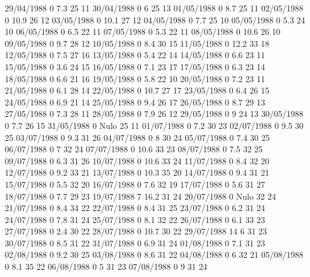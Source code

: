 29/04/1988  0      7.3    25     11 
30/04/1988  0      6      25     13 
01/05/1988  0      8.7    25     11 
02/05/1988  0      10.9   26     12 
03/05/1988  0      10.1   27     12 
04/05/1988  0      7.7    25     10 
05/05/1988  0      5.3    24     10 
06/05/1988  0      6.5    22     11 
07/05/1988  0      5.3    22     11 
08/05/1988  0      10.6   26     10 
09/05/1988  0      9.7    28     12 
10/05/1988  0      8.4    30     15 
11/05/1988  0      12.2   33     18 
12/05/1988  0      7.5    27     16 
13/05/1988  0      5.4    22     14 
14/05/1988  0      6.6    23     11 
15/05/1988  0      3.6    24     15 
16/05/1988  0      7.1    23     17 
17/05/1988  0      6.3    23     14 
18/05/1988  0      6.6    21     16 
19/05/1988  0      5.8    22     10 
20/05/1988  0      7.2    23     11 
21/05/1988  0      6.1    28     14 
22/05/1988  0      10.7   27     17 
23/05/1988  0      6.4    26     15 
24/05/1988  0      6.9    21     14 
25/05/1988  0      9.4    26     17 
26/05/1988  0      8.7    29     13 
27/05/1988  0      7.3    28     11 
28/05/1988  0      7.9    26     12 
29/05/1988  0      9      24     13 
30/05/1988  0      7.7    26     15 
31/05/1988  0     Nulo    25     11 
01/07/1988  0      7.2    30     23 
02/07/1988  0      9.5    30     25 
03/07/1988  0      9.3    31     26 
04/07/1988  0      8      30     24 
05/07/1988  0      7.4    30     25 
06/07/1988  0      7      32     24 
07/07/1988  0      10.6   33     23 
08/07/1988  0      7.5    32     25 
09/07/1988  0      6.3    31     26 
10/07/1988  0      10.6   33     24 
11/07/1988  0      8.4    32     20 
12/07/1988  0      9.2    33     21 
13/07/1988  0      10.3   35     20 
14/07/1988  0      9.4    31     21 
15/07/1988  0      5.5    32     20 
16/07/1988  0      7.6    32     19 
17/07/1988  0      5.6    31     27 
18/07/1988  0      7.7    29     23 
19/07/1988  7      16.2   31     24 
20/07/1988  0     Nulo    32     24 
21/07/1988  0      8.4    34     22 
22/07/1988  0      8.4    31     25 
23/07/1988  0      6.2    31     24 
24/07/1988  0      7.8    31     24 
25/07/1988  0      8.1    32     22 
26/07/1988  0      6.1    33     23 
27/07/1988  0      2.4    30     22 
28/07/1988  0      10.7   30     22 
29/07/1988  14     6      31     23 
30/07/1988  0      8.5    31     22 
31/07/1988  0      6.9    31     24 
01/08/1988  0      7.1    31     23 
02/08/1988  0      9.2    30     25 
03/08/1988  0      8.6    31     22 
04/08/1988  0      6      32     21 
05/08/1988  0      8.1    35     22 
06/08/1988  0      5      31     23 
07/08/1988  0      9      31     24 
